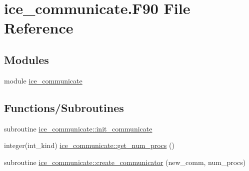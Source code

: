 \hypertarget{mpi_2ice__communicate_8F90}{
\section{ice\_\-communicate.F90 File Reference}
\label{mpi_2ice__communicate_8F90}
}
\subsection*{Modules}
\begin{DoxyCompactItemize}
\item 
module \hyperlink{namespaceice__communicate}{ice\_\-communicate}
\end{DoxyCompactItemize}
\subsection*{Functions/Subroutines}
\begin{DoxyCompactItemize}
\item 
subroutine \hyperlink{namespaceice__communicate_adbf0aa130556f1968ab2b21de96d9ac1}{ice\_\-communicate::init\_\-communicate}
\item 
integer(int\_\-kind) \hyperlink{namespaceice__communicate_a770f142bf42a8d6877c33aa88ee083a8}{ice\_\-communicate::get\_\-num\_\-procs} ()
\item 
subroutine \hyperlink{namespaceice__communicate_ad2adaa21b7db32dd0153db9ab8053403}{ice\_\-communicate::create\_\-communicator} (new\_\-comm, num\_\-procs)
\end{DoxyCompactItemize}
